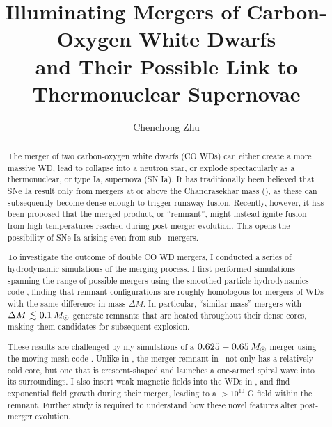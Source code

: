 \documentclass{ut-thesis}
\author{Chenchong Zhu}
\title{Illuminating Mergers of Carbon-Oxygen White Dwarfs \\
and Their Possible Link to Thermonuclear Supernovae}
\begin{document}
\begin{preliminary}

\maketitle


\begin{abstract}

The merger of two carbon-oxygen white dwarfs (CO WDs) can either create a more massive WD, lead to collapse into a neutron star, or explode spectacularly as a thermonuclear, or type Ia, supernova (SN Ia).  It has traditionally been believed that SNe Ia result only from mergers at or above the Chandrasekhar mass (\Mch), as these can subsequently become dense enough to trigger runaway fusion.  Recently, however, it has been proposed that the merged product, or ``remnant'', might instead ignite fusion from high temperatures reached during post-merger evolution.  This opens the possibility of SNe Ia arising even from sub-\Mch\ mergers.  

To investigate the outcome of double CO WD mergers, I conducted a series of hydrodynamic simulations of the merging process.  I first performed simulations spanning the range of possible mergers using the smoothed-particle hydrodynamics code \gasoline, finding that remnant configurations are roughly homologous for mergers of WDs with the same difference in mass $\Delta M$.  In particular, ``similar-mass'' mergers with $\Delta M \lesssim 0.1\,\Msun$ generate remnants that are heated throughout their dense cores, making them candidates for subsequent explosion.

These results are challenged by my simulations of a $0.625 - 0.65\,\Msun$ merger using the moving-mesh code \arepo.  Unlike in \gasoline, the merger remnant in \arepo\ not only has a relatively cold core, but one that is crescent-shaped and launches a one-armed spiral wave into its surroundings.  I also insert weak magnetic fields into the WDs in \arepo, and find exponential field growth during their merger, leading to a $>10^{10}$ G field within the remnant.  Further study is required to understand how these novel features alter post-merger evolution.


\end{abstract}
\end{preliminary}
\end{document}
